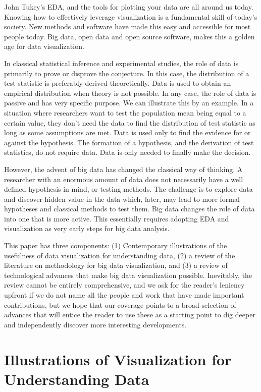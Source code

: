 \documentclass{article}
\begin{document}
John Tukey's EDA, and the tools for plotting your data are all around us today. Knowing how to effectively leverage visualization is a fundamental skill of today's society. New methods and software have made this easy and accessible for most people today. Big data, open data and open source software, makes this a golden age for data visualization.

In classical statistical inference and experimental studies, the role of data is primarily to prove or disprove the conjecture. In this case, the distribution of a test statistic is preferably derived theoretically. Data is used to obtain an empirical distribution when theory is not possible. In any case, the role of data is passive and has very specific purpose. We can illustrate this by an example. In a situation where researchers want to test the population mean being equal to a certain value, they don't need the data to find the distribution of test statistic as long as some assumptions are met. Data is used only to find the evidence for or against the hypothesis. The formation of a hypothesis, and the derivation of test statistics, do not require data. Data is only needed to finally make the decision.

However, the advent of big data has changed the classical way of thinking. A researcher with an enormous amount of data does not necessarily have a well defined hypothesis in mind, or testing methods. The challenge is to explore data and discover hidden value in the data which, later, may lead to more formal hypotheses and classical methods to test them. Big data changes the role of data into one that is more active. This essentially requires adopting EDA and visualization as very early steps for big data analysis. 

This paper has three components: (1) Contemporary illustrations of the usefulness of data visualization for understanding data, (2) a review of the literature on methodology for big data visualization, and (3) a review of technological advances that make big data visualization possible. Inevitably, the review cannot be entirely comprehensive, and we ask for the reader's leniency upfront if we do not name all the people and work that have made important contributions, but we hope that our coverage points to a broad selection of advances that will entice the reader to use these as a starting point to dig deeper and independently discover more interesting developments.

\section{Illustrations of Visualization for Understanding Data}
\end{document}

